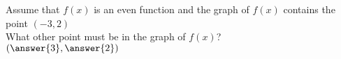 \documentclass{ximera}
\author{David Kish}
\begin{document}
\begin{exercise}
Assume that $f(x)$ is an even function and the graph of $f(x)$ contains the point $(-3,2)$\\
What other point must be in the graph of $f(x)$?\\
$(\answer{3},\answer{2})$
\end{exercise}
\end{document}

